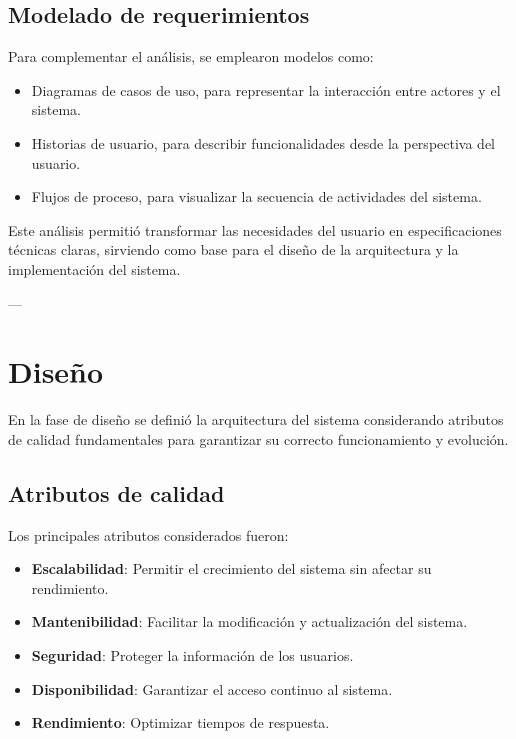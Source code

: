 \subsection*{Modelado de requerimientos}

Para complementar el análisis, se emplearon modelos como:

\begin{itemize}
    \item Diagramas de casos de uso, para representar la interacción entre actores y el sistema.
    \item Historias de usuario, para describir funcionalidades desde la perspectiva del usuario.
    \item Flujos de proceso, para visualizar la secuencia de actividades del sistema.
\end{itemize}

Este análisis permitió transformar las necesidades del usuario en especificaciones técnicas claras, sirviendo como base para el diseño de la arquitectura y la implementación del sistema.

---

\section{Diseño}

En la fase de diseño se definió la arquitectura del sistema considerando atributos de calidad fundamentales para garantizar su correcto funcionamiento y evolución.

\subsection*{Atributos de calidad}

Los principales atributos considerados fueron:

\begin{itemize}
    \item \textbf{Escalabilidad}: Permitir el crecimiento del sistema sin afectar su rendimiento.
    \item \textbf{Mantenibilidad}: Facilitar la modificación y actualización del sistema.
    \item \textbf{Seguridad}: Proteger la información de los usuarios.
    \item \textbf{Disponibilidad}: Garantizar el acceso continuo al sistema.
    \item \textbf{Rendimiento}: Optimizar tiempos de respuesta.
\end{itemize}

